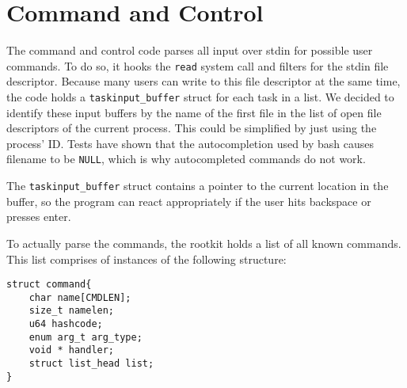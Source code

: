 \section{Command and Control}
The command and control code parses all input over stdin for possible user 
commands. To do so, it hooks the \texttt{read} system call and filters for the 
stdin file descriptor. Because many users can write to this file descriptor at 
the same time, the code holds a \verb+taskinput_buffer+ struct for each task in 
a list. We decided to identify these input buffers by the name of the first 
file in the list of open file descriptors of the current process. 
This could be simplified by just using the process' ID.
Tests have shown that the autocompletion used by bash causes filename to be 
\texttt{NULL}, which is why autocompleted commands do not work.\par
The \verb+taskinput_buffer+ struct contains a pointer to the current location 
in the buffer, so the program can react appropriately if the user hits 
backspace or presses enter.\par
To actually parse the commands, the rootkit holds a list of all known commands. 
This list comprises of instances of the following structure:
\lstset{escapechar=,style=customc}
\begin{lstlisting}
struct command{
	char name[CMDLEN];
	size_t namelen;
	u64 hashcode;
	enum arg_t arg_type;
	void * handler;
	struct list_head list;
}
\end{lstlisting}
